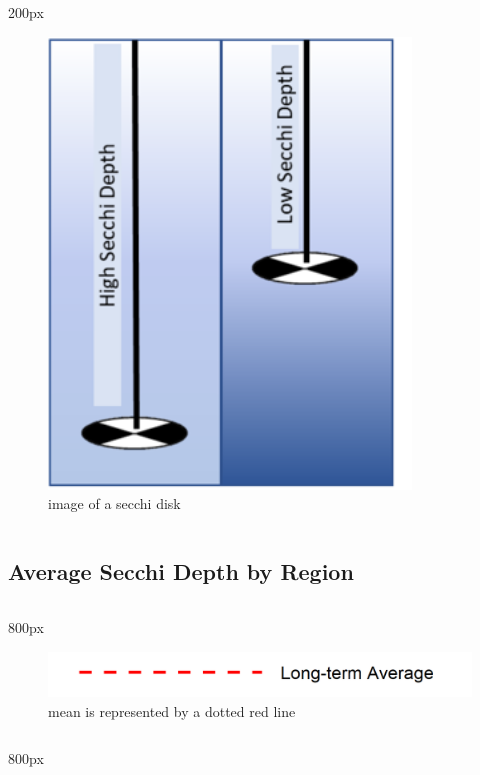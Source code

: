 \documentclass[
]{book}
\begin{document}
\begin{column}{200px\textwidth}
\begin{figure}

{\centering \includegraphics[width=3.79in]{figures/secchidisc} 

}

\caption{image of a secchi disk}\label{fig:unnamed-chunk-94}
\end{figure}
\end{column}

\hypertarget{average-secchi-depth-by-region-2}{%
\subsection{Average Secchi Depth by Region}\label{average-secchi-depth-by-region-2}}

\begin{column}{800px\textwidth}
\begin{figure}
\includegraphics[width=15.25in]{figures/mline} \caption{mean is represented by a dotted red line}\label{fig:unnamed-chunk-95}
\end{figure}
\end{column}

\begin{column}{800px\textwidth}
\end{column}
\end{document}
